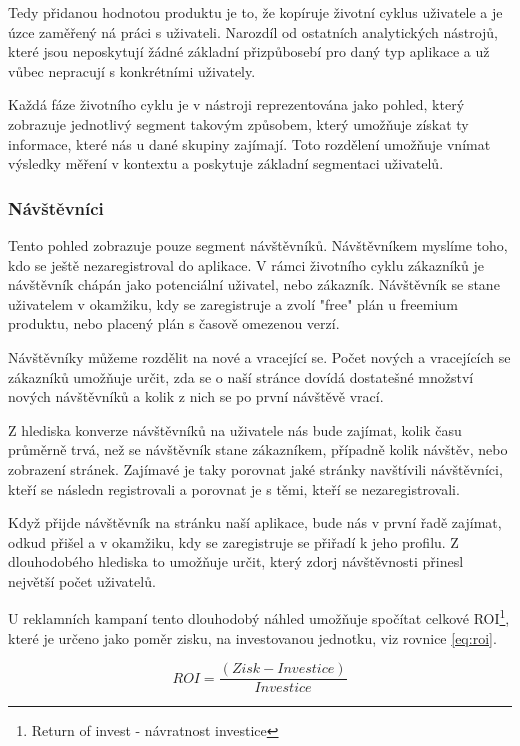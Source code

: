 \documentclass[bc,female,java,dept456]{diploma}						%
\begin{document}
Tedy přidanou hodnotou produktu je to, že kopíruje životní cyklus uživatele a je úzce zaměřený ná práci s uživateli. Narozdíl od ostatních analytických nástrojů, které jsou neposkytují žádné základní přizpůbosebí pro daný typ aplikace a už vůbec nepracují s konkrétními uživately.

Každá fáze životního cyklu je v nástroji reprezentována jako pohled, který zobrazuje jednotlivý segment takovým způsobem, který umožňuje získat ty informace, které nás u dané skupiny zajímají. Toto rozdělení umožňuje vnímat výsledky měření v kontextu a poskytuje základní segmentaci uživatelů.



\subsubsection{Návštěvníci}

Tento pohled zobrazuje pouze segment návštěvníků. Návštěvníkem myslíme toho, kdo se ještě nezaregistroval do aplikace. V rámci životního cyklu zákazníků je návštěvník chápán jako potenciální uživatel, nebo zákazník. Návštěvník se stane uživatelem v okamžiku, kdy se zaregistruje a zvolí "free" plán u freemium produktu, nebo placený plán s časově omezenou verzí.

Návštěvníky můžeme rozdělit na nové a vracející se. Počet nových a vracejících se zákazníků umožňuje určit, zda se o naší stránce dovídá dostatešné množství nových návštěvníků a kolik z nich se po první návštěvě vrací. 

Z hlediska konverze návštěvníků na uživatele nás bude zajímat, kolik času průměrně trvá, než se návštěvník stane zákazníkem, případně kolik návštěv, nebo zobrazení stránek. Zajímavé je taky porovnat jaké stránky navštívili návštěvníci, kteří se následn registrovali a porovnat je s těmi, kteří se nezaregistrovali.

Když přijde návštěvník na stránku naší aplikace, bude nás v první řadě zajímat, odkud přišel a v okamžiku, kdy se zaregistruje se přiřadí k jeho profilu. Z dlouhodobého hlediska to umožňuje určit, který zdorj návštěvnosti přinesl největší počet uživatelů. 

U reklamních kampaní tento dlouhodobý náhled umožňuje spočítat celkové ROI\footnote{Return of invest - návratnost investice}, které je určeno jako poměr zisku, na investovanou jednotku, viz rovnice \ref{eq:roi}.

\begin{equation}\label{eq:roi}
ROI = \frac{(Zisk - Investice)}{Investice}
\end{equation}
\end{document}
